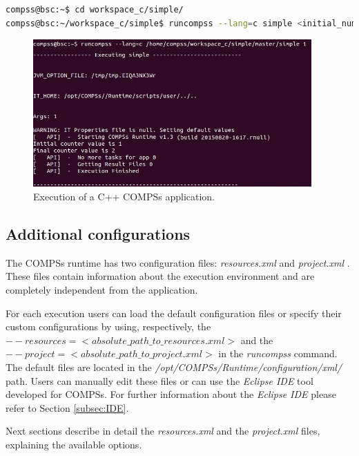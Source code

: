 \begin{lstlisting}[language=bash]
compss@bsc:~$ cd workspace_c/simple/
compss@bsc:~/workspace_c/simple$ runcompss --lang=c simple <initial_number>
\end{lstlisting}

\begin{figure}[h!]
  \centering
    \includegraphics[width=0.95\textwidth]{./Sections/2_Execution/Figures/c_execution.jpeg}
    \caption{Execution of a C++ COMPSs application.}
    \label{fig:c_execution}
\end{figure}
\vspace{-0.4cm}


\subsection{Additional configurations}

The COMPSs runtime has two configuration files: \textit{resources.xml} and \textit{project.xml} . 
These files contain information about the execution environment and are completely independent from the application.

For each execution users can load the default configuration files or specify their custom configurations 
by using, respectively, the \textit{$--resources=<absolute\_path\_to\_resources.xml>$} and the
\textit{$--project=<absolute\_path\_to\_project.xml>$} in the \textit{runcompss} command. The default files are located 
in the \emph{/opt/COMPSs/Runtime/configuration/xml/} path. 
Users can manually edit these files or can use the \textit{Eclipse IDE} tool developed for COMPSs. For further 
information about the \textit{Eclipse IDE} please refer to Section \ref{subsec:IDE}. 


Next sections describe in detail the \textit{resources.xml} and the \textit{project.xml} files, 
explaining the available options.

